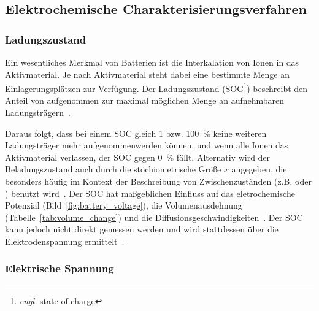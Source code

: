 \subsection{Elektrochemische Charakterisierungsverfahren}

\subsubsection*{Ladungszustand}
Ein wesentliches Merkmal von Batterien ist die Interkalation von Ionen in das Aktivmaterial. Je nach Aktivmaterial steht dabei eine bestimmte Menge an Einlagerungsplätzen zur Verfügung. Der Ladungszustand (SOC\footnote{\textit{engl.} state of charge}) beschreibt den Anteil von aufgenommen zur maximal möglichen Menge an aufnehmbaren Ladungsträgern~\cite{Plett2015}.

Daraus folgt, dass bei einem SOC gleich 1 bzw. 100~\% keine weiteren Ladungsträger mehr aufgenommenwerden können, und wenn alle Ionen das Aktivmaterial verlassen, der SOC gegen 0~\% fällt. Alternativ wird der Beladungszustand auch durch die stöchiometrische Größe $x$ angegeben, die besonders häufig im Kontext der Beschreibung von Zwischenzuständen (z.B.  oder ) benutzt wird~\cite{Newman2021}. Der SOC hat maßgeblichen Einfluss auf das eletrochemische Potenzial (Bild~\ref{fig:battery_voltage}), die Volumenausdehnung (Tabelle~\ref{tab:volume_change}) und die Diffusionsgeschwindigkeiten~\cite{Plett2024}. Der SOC kann jedoch nicht direkt gemessen werden und wird stattdessen über die Elektrodenspannung ermittelt~\cite{Newman2021}.



\subsubsection*{Elektrische Spannung}

